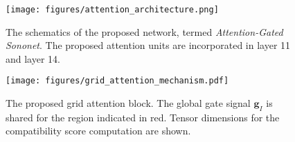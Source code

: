 \documentclass{article}
\providecommand{\mb}[1]{\mathbf{#1}}
\begin{document}
\begin{figure}[!t]
	\centering
	\texttt{[image: figures/attention\_architecture.png]}
	\caption{The schematics of the proposed network, termed \emph{Attention-Gated Sononet}. The proposed attention units are incorporated in layer 11 and layer 14.}
	\label{fig:modelschematic}
\end{figure}

\begin{figure}[!t]
	\centering
	\texttt{[image: figures/grid\_attention\_mechanism.pdf]}
	\caption{The proposed grid attention block. The global gate signal $\mb{g}_I$ is shared for the region indicated in red. Tensor dimensions for the compatibility score computation are shown.}
	\label{fig:attentionblock}
\end{figure}
\end{document}
